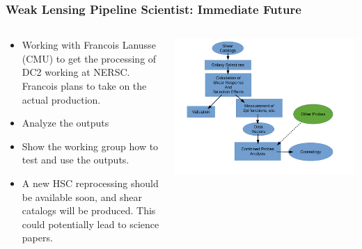 \documentclass[aspectratio=169]{beamer}
\begin{document}
\frame
{

    \frametitle{Weak Lensing Pipeline Scientist: Immediate Future}


    \begin{columns}
        \begin{column}{0.5\textwidth}
            \begin{itemize}

                \item Working with Francois Lanusse (CMU) to get the processing
                    of DC2 working at NERSC. Francois plans to take on the
                    actual production.

                \item Analyze the outputs

                \item Show the working group how to test and use the outputs.

                \item A new HSC reprocessing should be available soon, and
                    shear catalogs will be produced.  This could 
                    potentially lead to science papers.

            \end{itemize}

        \end{column}

        \begin{column}{0.5\textwidth}
            \centering
            \includegraphics[width=\textwidth]{LSSTAnalysisWorkflow.pdf}
        \end{column}
    \end{columns}

}
\end{document}
